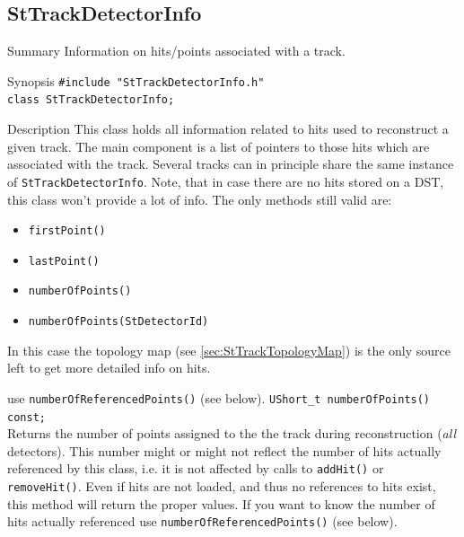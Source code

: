 \documentclass[twoside]{article}
\begin{document}
\subsection{StTrackDetectorInfo}
\item[Summary] Information on hits/points associated with a track.
\item[Synopsis]
    \verb+#include "StTrackDetectorInfo.h"+\\
    \verb+class StTrackDetectorInfo;+\\
\item[Description] This class holds all information related to hits
    used to reconstruct a given track. The main component is a list of
    pointers to those hits which are associated with the track.
    Several tracks can in principle share the same instance of
    \texttt{StTrackDetectorInfo}.  Note, that in case there are no
    hits stored on a DST, this class won't provide a lot of info.
    The only methods still valid are:
    \begin{itemize}
    \item \texttt{firstPoint()}
    \item \texttt{lastPoint()}
    \item \texttt{numberOfPoints()}
    \item \texttt{numberOfPoints(StDetectorId)}
    \end{itemize}
    In this case the topology map (see \ref{sec:StTrackTopologyMap})
    is the only source left to get more detailed info on hits.
    
    
    use \texttt{numberOfReferencedPoints()} (see below).
    \verb+UShort_t numberOfPoints() const;+\\
    Returns the number of points assigned to the the track during
    reconstruction (\emph{all} detectors).  This number might or might
    not reflect the number of hits actually referenced by this class,
    i.e. it is not affected by calls to \texttt{addHit()} or
    \texttt{removeHit()}. Even if hits are not loaded, and thus no
    references to hits exist, this method will return the proper
    values. If you want to know the number of hits actually referenced
    use \texttt{numberOfReferencedPoints()} (see below).
\end{document}
